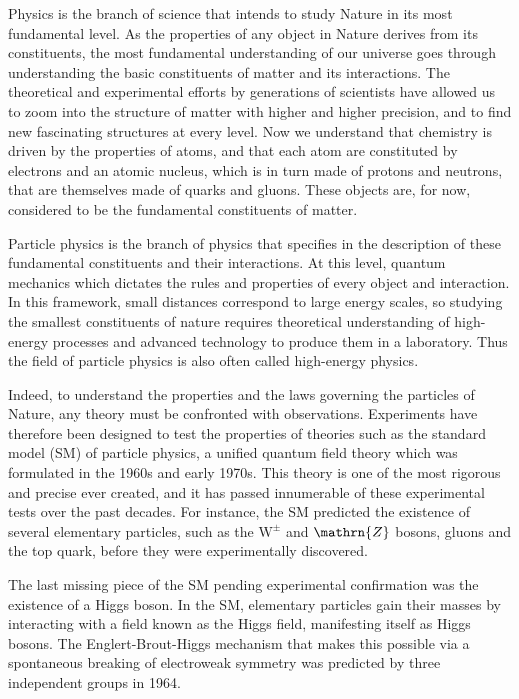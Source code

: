 Physics is the branch of science that intends to study Nature in its most fundamental level. As the properties of any object in Nature derives from its constituents, the most fundamental understanding of our universe goes through understanding the basic constituents of matter and its interactions. The theoretical and experimental efforts by generations of scientists have allowed us to zoom into the structure of matter with higher and higher precision, and to find new fascinating structures at every level. Now we understand that chemistry is driven by the properties of atoms, and that each atom are constituted by electrons and an atomic nucleus, which is in turn made of protons and neutrons, that are themselves made of quarks and gluons. These objects are, for now, considered to be the fundamental constituents of matter.

Particle physics is the branch of physics that specifies in the description of these fundamental constituents and their interactions. At this level, quantum mechanics which dictates the rules and properties of every object and interaction. In this framework, small distances correspond to large energy scales, so studying the smallest constituents of nature requires theoretical understanding of high-energy processes and advanced technology to produce them in a laboratory. Thus the field of particle physics is also often called high-energy physics.

Indeed, to understand the properties and the laws governing the particles of Nature, any theory must be confronted with observations. Experiments have therefore been designed to test the properties of theories such as the standard model (SM) of particle physics, a unified quantum field theory which was formulated in the 1960s and early 1970s. This theory is one of the most rigorous and precise ever created, and it has passed innumerable of these experimental tests over the past decades. For instance, the SM predicted the existence of several elementary particles, such as the $\mathrm{W^{\pm}}$ and $\mathrn{Z}$ bosons, gluons and the top quark, before they were experimentally discovered.

The last missing piece of the SM pending experimental confirmation was the existence of a Higgs boson. In the SM, elementary particles gain their masses by interacting with a field known as the Higgs field, manifesting itself as Higgs bosons. The Englert-Brout-Higgs mechanism that makes this possible via a spontaneous breaking of electroweak symmetry was predicted by three independent groups in 1964.

